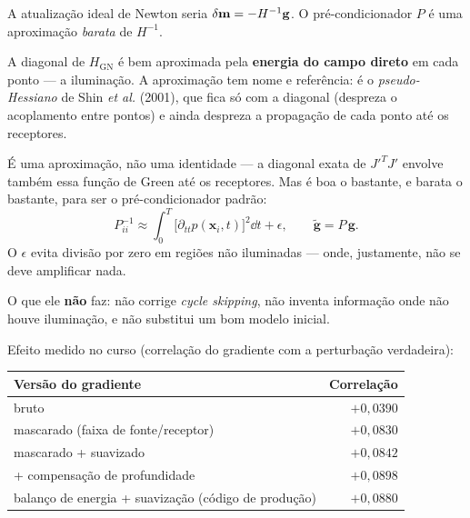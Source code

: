 \documentclass[11pt,a4paper,oneside]{report}
\begin{document}
\begin{teoria}
A atualiza\c{c}\~ao ideal de Newton seria
$\delta\mathbf{m} = -H^{-1}\mathbf{g}$. O pr\'e-condicionador $P$ \'e uma
aproxima\c{c}\~ao \emph{barata} de $H^{-1}$.

A diagonal de $H_{\text{GN}}$ \'e bem aproximada pela \textbf{energia do campo
direto} em cada ponto --- a ilumina\c{c}\~ao. A aproxima\c{c}\~ao tem nome e
refer\^encia: \'e o \emph{pseudo-Hessiano} de Shin \emph{et al.} (2001), que
fica s\'o com a diagonal (despreza o acoplamento entre pontos) e ainda
despreza a propaga\c{c}\~ao de cada ponto at\'e os receptores.

\'E uma aproxima\c{c}\~ao, n\~ao uma identidade --- a diagonal exata de
$J'^{T}J'$ envolve tamb\'em essa fun\c{c}\~ao de Green at\'e os receptores.
Mas \'e boa o bastante, e barata o bastante, para ser o pr\'e-condicionador
padr\~ao:
\begin{equation}
P^{-1}_{ii} \approx \int_0^T \bigl[\partial_{tt} p(\mathbf{x}_i,t)\bigr]^{2}
  \dd t + \epsilon,
\qquad
\tilde{\mathbf{g}} = P\,\mathbf{g}.
\end{equation}
O $\epsilon$ evita divis\~ao por zero em regi\~oes n\~ao iluminadas --- onde,
justamente, n\~ao se deve amplificar nada.

O que ele \textbf{n\~ao} faz: n\~ao corrige \emph{cycle skipping}, n\~ao
inventa informa\c{c}\~ao onde n\~ao houve ilumina\c{c}\~ao, e n\~ao substitui
um bom modelo inicial.
\end{teoria}

Efeito medido no curso (correla\c{c}\~ao do gradiente com a perturba\c{c}\~ao
verdadeira):

\begin{center}
\begin{tabular}{@{}lr@{}}
\toprule
\textbf{Vers\~ao do gradiente} & \textbf{Correla\c{c}\~ao} \\
\midrule
bruto & $+0{,}0390$ \\
mascarado (faixa de fonte/receptor) & $+0{,}0830$ \\
mascarado + suavizado & $+0{,}0842$ \\
+ compensa\c{c}\~ao de profundidade & $+0{,}0898$ \\
balan\c{c}o de energia + suaviza\c{c}\~ao (c\'odigo de produ\c{c}\~ao) & $+0{,}0880$ \\
\bottomrule
\end{tabular}
\end{center}
\end{document}
